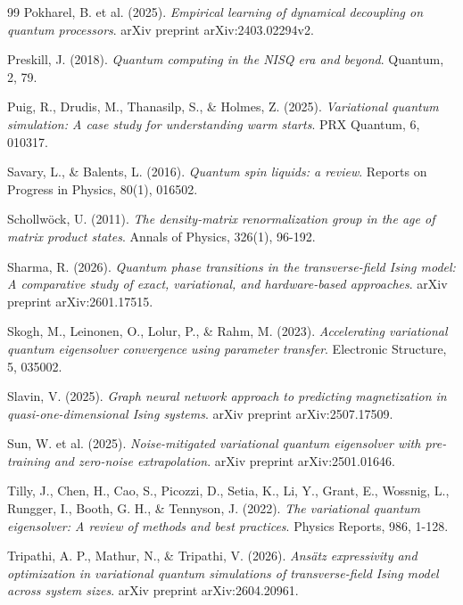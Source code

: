 \documentclass[11pt,a4paper,spanish]{book}
\begin{document}
\begin{thebibliography}{99}
 Pokharel, B. et al. (2025). \emph{Empirical learning of dynamical decoupling on quantum processors}. arXiv preprint arXiv:2403.02294v2.

 Preskill, J. (2018). \emph{Quantum computing in the NISQ era and beyond}. Quantum, 2, 79.

 Puig, R., Drudis, M., Thanasilp, S., \& Holmes, Z. (2025). \emph{Variational quantum simulation: A case study for understanding warm starts}. PRX Quantum, 6, 010317.

 Savary, L., \& Balents, L. (2016). \emph{Quantum spin liquids: a review}. Reports on Progress in Physics, 80(1), 016502.

 Schollwöck, U. (2011). \emph{The density-matrix renormalization group in the age of matrix product states}. Annals of Physics, 326(1), 96-192.

 Sharma, R. (2026). \emph{Quantum phase transitions in the transverse-field Ising model: A comparative study of exact, variational, and hardware-based approaches}. arXiv preprint arXiv:2601.17515.

 Skogh, M., Leinonen, O., Lolur, P., \& Rahm, M. (2023). \emph{Accelerating variational quantum eigensolver convergence using parameter transfer}. Electronic Structure, 5, 035002.

 Slavin, V. (2025). \emph{Graph neural network approach to predicting magnetization in quasi-one-dimensional Ising systems}. arXiv preprint arXiv:2507.17509.

 Sun, W. et al. (2025). \emph{Noise-mitigated variational quantum eigensolver with pre-training and zero-noise extrapolation}. arXiv preprint arXiv:2501.01646.

 Tilly, J., Chen, H., Cao, S., Picozzi, D., Setia, K., Li, Y., Grant, E., Wossnig, L., Rungger, I., Booth, G. H., \& Tennyson, J. (2022). \emph{The variational quantum eigensolver: A review of methods and best practices}. Physics Reports, 986, 1-128.

 Tripathi, A. P., Mathur, N., \& Tripathi, V. (2026). \emph{Ansätz expressivity and optimization in variational quantum simulations of transverse-field Ising model across system sizes}. arXiv preprint arXiv:2604.20961.


\end{thebibliography}
\end{document}
